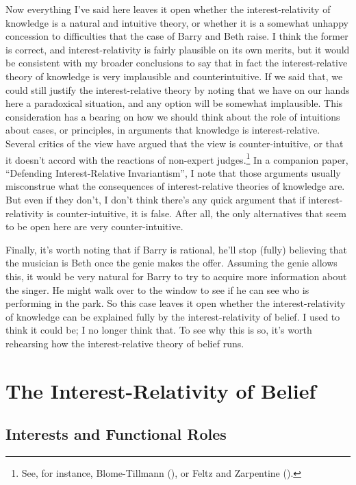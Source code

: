 \documentclass[
  10pt,
  letterpaper,
  DIV=11,
  numbers=noendperiod,
  twoside]{scrartcl}
\begin{document}
Now everything I've said here leaves it open whether the
interest-relativity of knowledge is a natural and intuitive theory, or
whether it is a somewhat unhappy concession to difficulties that the
case of Barry and Beth raise. I think the former is correct, and
interest-relativity is fairly plausible on its own merits, but it would
be consistent with my broader conclusions to say that in fact the
interest-relative theory of knowledge is very implausible and
counterintuitive. If we said that, we could still justify the
interest-relative theory by noting that we have on our hands here a
paradoxical situation, and any option will be somewhat implausible. This
consideration has a bearing on how we should think about the role of
intuitions about cases, or principles, in arguments that knowledge is
interest-relative. Several critics of the view have argued that the view
is counter-intuitive, or that it doesn't accord with the reactions of
non-expert judges.\footnote{See, for instance, Blome-Tillmann
  (), or Feltz and Zarpentine
  ().} In a companion paper,
``Defending Interest-Relative Invariantism'', I note that those
arguments usually misconstrue what the consequences of interest-relative
theories of knowledge are. But even if they don't, I don't think there's
any quick argument that if interest-relativity is counter-intuitive, it
is false. After all, the only alternatives that seem to be open here are
very counter-intuitive.

Finally, it's worth noting that if Barry is rational, he'll stop (fully)
believing that the musician is Beth once the genie makes the offer.
Assuming the genie allows this, it would be very natural for Barry to
try to acquire more information about the singer. He might walk over to
the window to see if he can see who is performing in the park. So this
case leaves it open whether the interest-relativity of knowledge can be
explained fully by the interest-relativity of belief. I used to think it
could be; I no longer think that. To see why this is so, it's worth
rehearsing how the interest-relative theory of belief runs.

\section{The Interest-Relativity of Belief}\label{sec-2}

\subsection{Interests and Functional
Roles}\label{interests-and-functional-roles}
\end{document}
